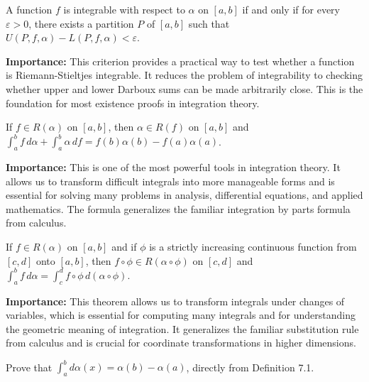 \begin{theorem}
A function $f$ is integrable with respect to $\alpha$ on $[a, b]$ if and only if for every $\varepsilon > 0$, there exists a partition $P$ of $[a, b]$ such that $U(P, f, \alpha) - L(P, f, \alpha) < \varepsilon$.
\end{theorem}

\noindent\textbf{Importance:} This criterion provides a practical way to test whether a function is Riemann-Stieltjes integrable. It reduces the problem of integrability to checking whether upper and lower Darboux sums can be made arbitrarily close. This is the foundation for most existence proofs in integration theory.



\begin{theorem}
If $f \in R(\alpha)$ on $[a, b]$, then $\alpha \in R(f)$ on $[a, b]$ and $\int_a^b f \, d\alpha + \int_a^b \alpha \, df = f(b)\alpha(b) - f(a)\alpha(a)$.
\end{theorem}

\noindent\textbf{Importance:} This is one of the most powerful tools in integration theory. It allows us to transform difficult integrals into more manageable forms and is essential for solving many problems in analysis, differential equations, and applied mathematics. The formula generalizes the familiar integration by parts formula from calculus.



\begin{theorem}
If $f \in R(\alpha)$ on $[a, b]$ and if $\phi$ is a strictly increasing continuous function from $[c, d]$ onto $[a, b]$, then $f \circ \phi \in R(\alpha \circ \phi)$ on $[c, d]$ and $\int_a^b f \, d\alpha = \int_c^d f \circ \phi \, d(\alpha \circ \phi)$.
\end{theorem}

\noindent\textbf{Importance:} This theorem allows us to transform integrals under changes of variables, which is essential for computing many integrals and for understanding the geometric meaning of integration. It generalizes the familiar substitution rule from calculus and is crucial for coordinate transformations in higher dimensions.



\begin{problembox}
\begin{problemstatement}
Prove that $\int_a^b d\alpha(x) = \alpha(b) - \alpha(a)$, directly from Definition 7.1.
\end{problemstatement}
\end{problembox}

